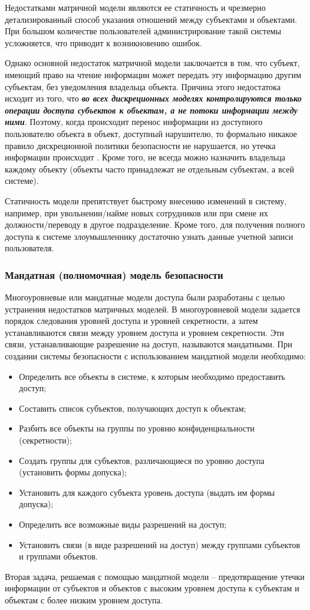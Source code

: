 Недостатками матричной модели являются ее статичность и чрезмерно детализированный способ указания 
отношений между субъектами и объектами. При большом количестве пользователей администрирование такой 
системы усложняется, что приводит к возникновению ошибок.

Однако основной недостаток матричной модели заключается в том, что субъект, имеющий право на чтение 
информации может передать эту информацию другим субъектам, без уведомления владельца объекта. Причина 
этого недостатока исходит из того, что \textbf{\textit{во всех дискреционных моделях контролируются только 
операции доступа субъектов к объектам, а не потоки информации между ними}}. Поэтому, когда происходит 
перенос информации из доступного пользователю объекта в объект, доступный нарушителю, то формально 
никакое правило дискреционной политики безопасности не нарушается, но утечка информации происходит 
\autocite{URFULecture10Models}. Кроме того, не всегда можно назначить владельца каждому объекту 
(объекты часто принадлежат не отдельным субъектам, а всей системе).

Статичность модели препятствует быстрому внесению изменений в систему, например, при увольнении/найме 
новых сотрудников или при смене их должности/переводу в другое подразделение. Кроме того, для получения 
полного доступа к системе злоумышленнику достаточно узнать данные учетной записи пользователя. 

\subsubsection{Мандатная (полномочная) модель безопасности}

Многоуровневые или мандатные модели доступа были разработаны с целью устранения недостатков матричных моделей.
В многоуровневой модели задается порядок следования уровней доступа и уровней секретности, а затем устанавливаются связи между уровнем доступа и уровнем секретности.
Эти связи, устанавливающие разрешение на доступ, называются мандатными.
При создании системы безопасности с использованием мандатной модели необходимо:
\begin{itemize}
    \item Определить все объекты в системе, к которым необходимо предоставить доступ;
    \item Составить список субъектов, получающих доступ к объектам;
    \item Разбить все объекты на группы по уровню конфиденциальности (секретности);
    \item Создать группы для субъектов, различающиеся по уровню доступа (установить формы допуска);
    \item Установить для каждого субъекта уровень доступа (выдать им формы допуска);
    \item Определить все возможные виды разрешений на доступ;
    \item Установить связи (в виде разрешений на доступ) между группами субъектов и группами объектов.
\end{itemize}
Вторая задача, решаемая с помощью мандатной модели – предотвращение утечки информации от субъектов и объектов с высоким уровнем доступа к субъектам и объектам с более низким уровнем доступа.


